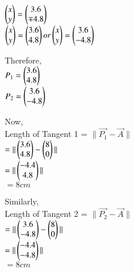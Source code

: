 \documentclass[journal,12pt,twocolumn]{IEEEtran}
\begin{document}
\vspace{0.25cm}
$ \begin{pmatrix}x \\y \end{pmatrix} = \begin{pmatrix}3.6\\\mp 4.8\end{pmatrix} $ \\
\vspace{0.25cm}
$ \begin{pmatrix}x \\y \end{pmatrix} = \begin{pmatrix}3.6\\ 4.8\end{pmatrix} or \begin{pmatrix}x \\y \end{pmatrix} = \begin{pmatrix}3.6\\ -4.8\end{pmatrix} $ \\
\vspace{0.25cm} 
\raggedright
Therefore,\\
\vspace{0.25cm}
\centering
$ P_1 = \begin{pmatrix}3.6\\ 4.8\end{pmatrix}$ \\
\vspace{0.25cm}
$P_2 = \begin{pmatrix}3.6\\ -4.8\end{pmatrix} $ \\
\vspace{0.4cm}
\raggedright
Now,\\
\vspace{0.25cm}
Length of Tangent 1 = $ \| \vec{P_1} - \vec{A} \| $\\
\vspace{0.25cm}
\centering
$ = \| \begin{pmatrix}3.6\\4.8\end{pmatrix} - \begin{pmatrix}8\\0\end{pmatrix} \| $\\
\vspace{0.25cm}
$ = \| \begin{pmatrix}-4.4\\4.8\end{pmatrix} \| $ \\
\vspace{0.25cm}
$ = 8cm $\\
\vspace{0.25cm}
\raggedright
Similarly,\\
\vspace{0.25cm}
Length of Tangent 2 = $ \| \vec{P_2} - \vec{A} \| $\\
\vspace{0.25cm}
\centering
$ = \| \begin{pmatrix}3.6\\-4.8\end{pmatrix} - \begin{pmatrix}8\\0\end{pmatrix} \| $\\
\vspace{0.25cm}
$ = \| \begin{pmatrix}-4.4\\-4.8\end{pmatrix} \| $ \\
\vspace{0.25cm}
$ = 8cm $\\
\end{document}
